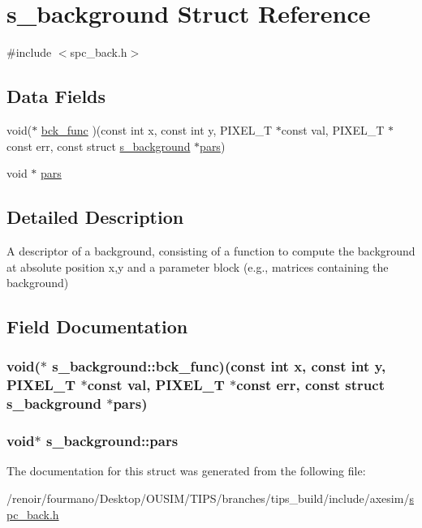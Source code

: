 \hypertarget{structs__background}{
\section{s\_\-background Struct Reference}
\label{structs__background}
}


{\ttfamily \#include $<$spc\_\-back.h$>$}\subsection*{Data Fields}
\begin{DoxyCompactItemize}
\item 
void($\ast$ \hyperlink{structs__background_ab2dc7068b6aff54492caa363238c372e}{bck\_\-func} )(const int x, const int y, PIXEL\_\-T $\ast$const val, PIXEL\_\-T $\ast$const err, const struct \hyperlink{structs__background}{s\_\-background} $\ast$\hyperlink{structs__background_a4d8837d7be9de01330a6fb4c24a2bf75}{pars})
\item 
void $\ast$ \hyperlink{structs__background_a4d8837d7be9de01330a6fb4c24a2bf75}{pars}
\end{DoxyCompactItemize}


\subsection{Detailed Description}
A descriptor of a background, consisting of a function to compute the background at absolute position x,y and a parameter block (e.g., matrices containing the background) 

\subsection{Field Documentation}
\hypertarget{structs__background_ab2dc7068b6aff54492caa363238c372e}{
\subsubsection[{bck\_\-func}]{\setlength{\rightskip}{0pt plus 5cm}void($\ast$ {\bf s\_\-background::bck\_\-func})(const int x, const int y, PIXEL\_\-T $\ast$const val, PIXEL\_\-T $\ast$const err, const struct {\bf s\_\-background} $\ast${\bf pars})}}
\label{structs__background_ab2dc7068b6aff54492caa363238c372e}
\hypertarget{structs__background_a4d8837d7be9de01330a6fb4c24a2bf75}{
\subsubsection[{pars}]{\setlength{\rightskip}{0pt plus 5cm}void$\ast$ {\bf s\_\-background::pars}}}
\label{structs__background_a4d8837d7be9de01330a6fb4c24a2bf75}


The documentation for this struct was generated from the following file:\begin{DoxyCompactItemize}
\item 
/renoir/fourmano/Desktop/OUSIM/TIPS/branches/tips\_\-build/include/axesim/\hyperlink{spc__back_8h}{spc\_\-back.h}\end{DoxyCompactItemize}
